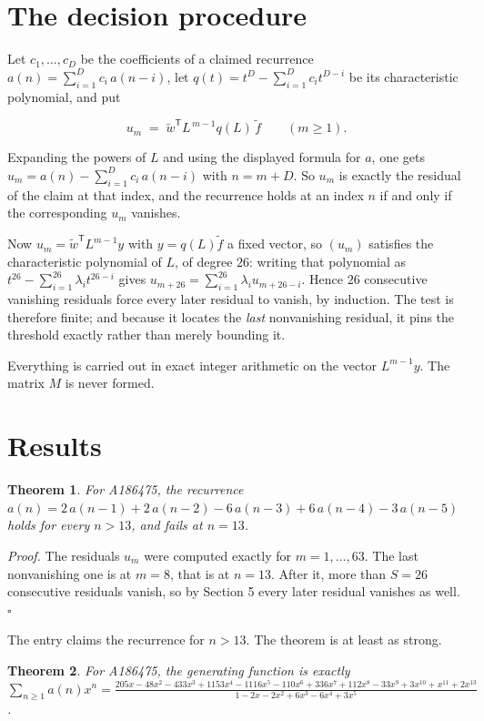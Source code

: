 \documentclass[11pt]{article}
\newtheorem{theorem}{Theorem}
\theoremstyle{definition}
\begin{document}
\section{The decision procedure}

Let $c_1,\dots,c_D$ be the coefficients of a claimed recurrence $a(n) = \sum_{i=1}^{D} c_i\,a(n-i)$, let $q(t) = t^{D} - \sum_{i=1}^{D} c_i t^{D-i}$ be its characteristic polynomial, and put

\[u_m \;=\; \tilde w^{\mathsf T} L^{\,m-1} q(L)\,\tilde f \qquad (m \ge 1).\]

Expanding the powers of $L$ and using the displayed formula for $a$, one gets $u_m = a(n) - \sum_{i=1}^{D} c_i\,a(n-i)$ with $n = m + D$. So $u_m$ is exactly the residual of the claim at that index, and the recurrence holds at an index $n$ if and only if the corresponding $u_m$ vanishes.

Now $u_m = \tilde w^{\mathsf T} L^{m-1} y$ with $y = q(L)\tilde f$ a fixed vector, so $(u_m)$ satisfies the characteristic polynomial of $L$, of degree $26$: writing that polynomial as $t^{26} - \sum_{i=1}^{26} \lambda_i t^{26-i}$ gives $u_{m+26} = \sum_{i=1}^{26} \lambda_i u_{m+26-i}$. Hence $26$ consecutive vanishing residuals force every later residual to vanish, by induction. The test is therefore finite; and because it locates the {\itshape last} nonvanishing residual, it pins the threshold exactly rather than merely bounding it.

Everything is carried out in exact integer arithmetic on the vector $L^{m-1}y$. The matrix $M$ is never formed.

\section{Results}

\begin{theorem} For A186475, the recurrence $a(n) = 2\,a(n-1) + 2\,a(n-2) - 6\,a(n-3) + 6\,a(n-4) - 3\,a(n-5)$ holds for every $n > 13$, and fails at $n = 13$.\end{theorem}

{\itshape Proof.} The residuals $u_m$ were computed exactly for $m = 1,\dots,63$. The last nonvanishing one is at $m = 8$, that is at $n = 13$. After it, more than $S = 26$ consecutive residuals vanish, so by Section 5 every later residual vanishes as well. $\square$

The entry claims the recurrence for $n > 13$. The theorem is at least as strong.

\begin{theorem} For A186475, the generating function is exactly $\sum_{n\ge 1} a(n)x^n = \frac{205x - 48x^{2} - 433x^{3} + 1153x^{4} - 1116x^{5} - 110x^{6} + 336x^{7} + 112x^{8} - 33x^{9} + 3x^{10} + x^{11} + 2x^{13}}{1 - 2x - 2x^{2} + 6x^{3} - 6x^{4} + 3x^{5}}$.\end{theorem}
\end{document}
